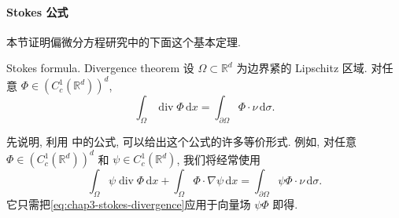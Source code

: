 \paragraph{Stokes 公式}

本节证明偏微分方程研究中的下面这个基本定理.

\begin{Theorem}{Stokes formula. Divergence theorem}
\label{thm:chap3-stokes-divergence}
设 $\Omega\subset\mathbb{R}^d$ 为边界紧的 Lipschitz 区域. 对任意 $\Phi\in(C_c^1(\mathbb{R}^d))^d$,
\begin{equation}
 \int_\Omega\operatorname{div}\Phi\,\mathrm{d}x
 =\int_{\partial\Omega}\Phi\cdot\nu\,\mathrm{d}\sigma.
 \label{eq:chap3-stokes-divergence}
\end{equation}
\end{Theorem}

先说明, 利用 中的公式, 可以给出这个公式的许多等价形式. 例如, 对任意 $\Phi\in(C_c^1(\mathbb R^d))^d$ 和 $\psi\in C_c^1(\mathbb R^d)$, 我们将经常使用
\begin{equation}
 \int_\Omega\psi\operatorname{div}\Phi\,\mathrm{d}x
 +\int_\Omega\Phi\cdot\nabla\psi\,\mathrm{d}x
 =\int_{\partial\Omega}\psi\Phi\cdot\nu\,\mathrm{d}\sigma.
 \label{eq:chap3-stokes-product}
\end{equation}
它只需把\eqref{eq:chap3-stokes-divergence}应用于向量场 $\psi\Phi$ 即得.

